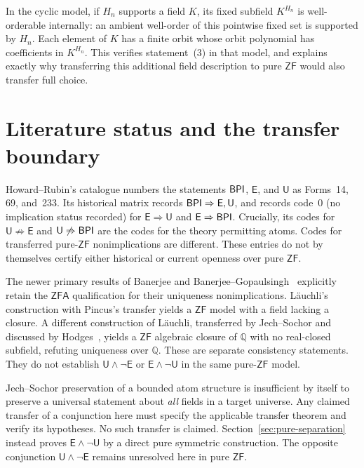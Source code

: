 \documentclass[11pt,a4paper]{article}
\theoremstyle{definition}\newtheorem{definition}[theorem]{Definition}
\theoremstyle{remark}\newtheorem{remark}[theorem]{Remark}
\newcommand{\ZF}{\mathsf{ZF}}\newcommand{\ZFA}{\mathsf{ZFA}}
\newcommand{\E}{\mathsf E}\newcommand{\U}{\mathsf U}
\newcommand{\Q}{\mathbb Q}\newcommand{\F}{\mathbb F}
\begin{document}
In the cyclic model, if $H_n$ supports a field $K$, its fixed subfield $K^{H_n}$ is well-orderable internally: an ambient well-order of this pointwise fixed set is supported by $H_n$. Each element of $K$ has a finite orbit whose orbit polynomial has coefficients in $K^{H_n}$. This verifies statement~(3) in that model, and explains exactly why transferring this additional field description to pure $\ZF$ would also transfer full choice.

\section{Literature status and the transfer boundary}\label{sec:status}
Howard--Rubin's catalogue numbers the statements $\mathsf{BPI}$, $\E$, and $\U$ as Forms~14, 69, and~233. Its historical matrix records $\BPI\Rightarrow\E,\U$, and records code~0 (no implication status recorded) for $\E\Rightarrow\U$ and $\E\Rightarrow\BPI$. Crucially, its codes for $\U\not\Rightarrow\E$ and $\U\not\Rightarrow\BPI$ are the codes for the theory permitting atoms. Codes for transferred pure-$\ZF$ nonimplications are different. These entries do not by themselves certify either historical or current openness over pure $\ZF$.

The newer primary results of Banerjee and Banerjee--Gopaulsingh~\cite{Banerjee,BG} explicitly retain the $\ZFA$ qualification for their uniqueness nonimplications. L\"auchli's construction with Pincus's transfer yields a $\ZF$ model with a field lacking a closure. A different construction of L\"auchli, transferred by Jech--Sochor and discussed by Hodges~\cite{Hodges}, yields a $\ZF$ algebraic closure of $\Q$ with no real-closed subfield, refuting uniqueness over $\Q$. These are separate consistency statements. They do not establish $\U\wedge\neg\E$ or $\E\wedge\neg\U$ in the same pure-$\ZF$ model.

Jech--Sochor preservation of a bounded atom structure is insufficient by itself to preserve a universal statement about \emph{all} fields in a target universe. Any claimed transfer of a conjunction here must specify the applicable transfer theorem and verify its hypotheses. No such transfer is claimed. Section~\ref{sec:pure-separation} instead proves $\E\wedge\neg\U$ by a direct pure symmetric construction. The opposite conjunction $\U\wedge\neg\E$ remains unresolved here in pure $\ZF$.
\end{document}
